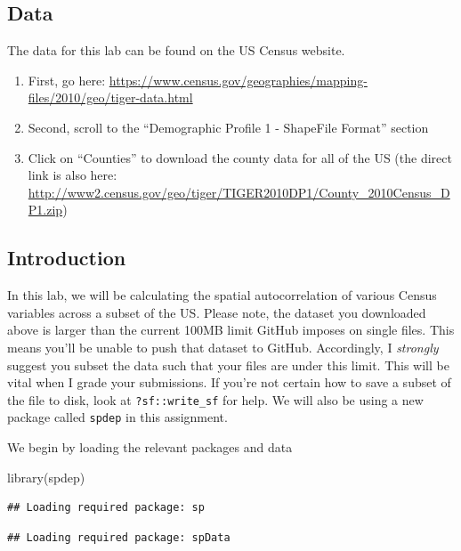 \documentclass[]{article}
\newenvironment{Shaded}{\begin{snugshade}}{\end{snugshade}}
\newcommand{\FunctionTok}[1]{\textcolor[rgb]{0.00,0.00,0.00}{#1}}
\newcommand{\NormalTok}[1]{#1}
\begin{document}
\hypertarget{data}{%
\subsection{Data}\label{data}}

The data for this lab can be found on the US Census website.

\begin{enumerate}
\def\labelenumi{\arabic{enumi}.}
\item
  First, go here:
  \url{https://www.census.gov/geographies/mapping-files/2010/geo/tiger-data.html}
\item
  Second, scroll to the ``Demographic Profile 1 - ShapeFile Format''
  section
\item
  Click on ``Counties'' to download the county data for all of the US
  (the direct link is also here:
  \url{http://www2.census.gov/geo/tiger/TIGER2010DP1/County_2010Census_DP1.zip})
\end{enumerate}

\hypertarget{introduction}{%
\subsection{Introduction}\label{introduction}}

In this lab, we will be calculating the spatial autocorrelation of
various Census variables across a subset of the US. Please note, the
dataset you downloaded above is larger than the current 100MB limit
GitHub imposes on single files. This means you'll be unable to push that
dataset to GitHub. Accordingly, I \emph{strongly} suggest you subset the
data such that your files are under this limit. This will be vital when
I grade your submissions. If you're not certain how to save a subset of
the file to disk, look at \texttt{?sf::write\_sf} for help. We will also
be using a new package called \texttt{spdep} in this assignment.

We begin by loading the relevant packages and data

\begin{Shaded}
\begin{Highlighting}[]
\FunctionTok{library}\NormalTok{(spdep)}
\end{Highlighting}
\end{Shaded}

\begin{verbatim}
## Loading required package: sp
\end{verbatim}

\begin{verbatim}
## Loading required package: spData
\end{verbatim}
\end{document}
